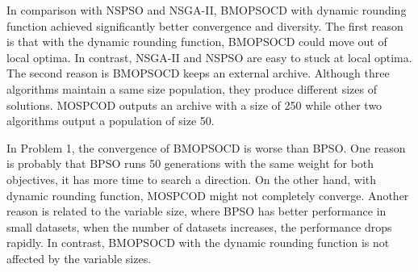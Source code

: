 In comparison with NSPSO and NSGA-II, BMOPSOCD with dynamic rounding function achieved significantly better convergence and diversity. The first reason is that with the dynamic
rounding function, BMOPSOCD could move out of local optima. In contrast, NSGA-II and NSPSO are easy to stuck at local optima. The second reason is BMOPSOCD 
keeps an external archive. Although three algorithms maintain a same size population, they produce different sizes of solutions. 
MOSPCOD outputs an archive with a size of 250 while other two algorithms output a population of size 50.

In Problem 1, the convergence of BMOPSOCD is worse than BPSO. One reason is probably that BPSO runs 50 generations with the same weight for both objectives,
it has more time to search a direction. On the other hand, with dynamic rounding function, MOSPCOD might not completely converge. Another reason is related to 
the variable size, where BPSO has better performance in small datasets, when the number of datasets increases, the performance drops rapidly. In contrast, 
BMOPSOCD with the dynamic rounding function is not affected by the variable sizes.
